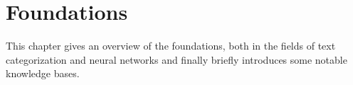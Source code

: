 \chapter{Foundations} \label{cha:foundations_basics}

This chapter gives an overview of the foundations, both in the fields of text categorization and neural networks and finally briefly introduces some notable knowledge bases.

%
% 






